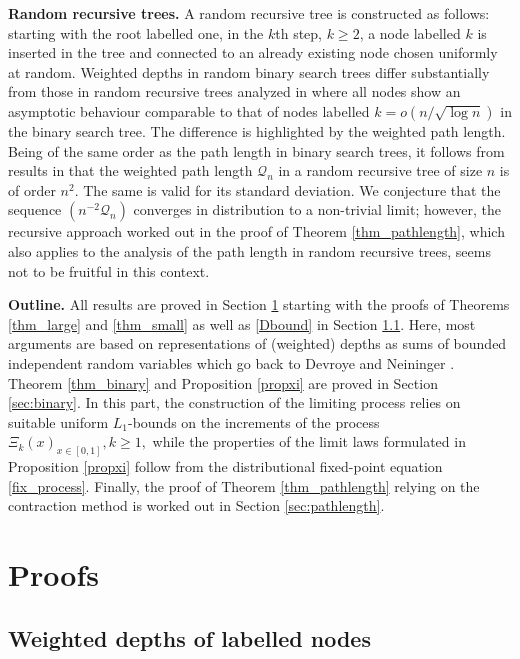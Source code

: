 \documentclass{amsart}       %
\begin{document}
\medskip  \textbf{Random recursive trees.}
A random recursive tree is constructed as follows: starting with the root labelled one, in the $k$th step, $k \geq 2$, a node labelled $k$ is inserted in the tree and connected to an already existing node chosen uniformly at random. Weighted depths in random binary search trees differ substantially from those in random recursive trees analyzed in \cite{kupa07} where all nodes show an asymptotic behaviour comparable to that  of nodes labelled $k = o(n/\sqrt{\log n})$ in the binary search tree. The difference is highlighted by the weighted path length. Being of the same order as the path length in binary search trees, it follows from results in \cite{kupa07} that the weighted path length $\mathcal{Q}_n$ in a random recursive tree of size $n$ is of order $n^2$. The same is valid for its standard deviation. We conjecture that the sequence $(n^{-2} \mathcal{Q}_n)$ converges in distribution to a non-trivial limit; however, the recursive approach worked out in the proof of Theorem \ref{thm_pathlength}, which also applies to the analysis of the path length in random recursive trees, seems not to be fruitful in this context.

\medskip  \textbf{Outline.} All results are proved in Section \ref{sec:2} starting with the proofs of Theorems \ref{thm_large} and \ref{thm_small} as well as \eqref{Dbound} in Section \ref{sec:typical}. Here, most arguments are based on representations of (weighted) depths as sums of bounded independent random variables which go back to Devroye and Neininger \cite{denefinger04}.
Theorem \ref{thm_binary} and Proposition \ref{propxi} are proved in Section \ref{sec:binary}. In this part, the construction of the limiting process relies on suitable uniform $L_1$-bounds on the increments of the process $\Xi_k(x)_{x \in [0,1]}, k \geq 1,$ while the properties of the limit laws formulated in Proposition \ref{propxi} follow from the distributional fixed-point equation \eqref{fix_process}.
Finally, the proof of Theorem \ref{thm_pathlength} relying on the contraction method is worked out in Section \ref{sec:pathlength}.


\section{Proofs} \label{sec:2}
\subsection{Weighted depths of labelled nodes} \label{sec:typical}
\end{document}
